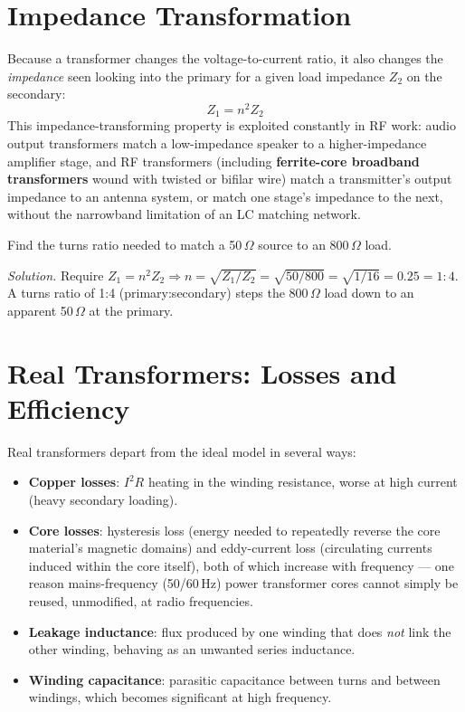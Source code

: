 \section{Impedance Transformation}

Because a transformer changes the voltage-to-current ratio, it also
changes the \emph{impedance} seen looking into the primary for a given
load impedance $Z_2$ on the secondary:
\[
\boxed{Z_1 = n^2 Z_2}
\]
This impedance-transforming property is exploited constantly in RF
work: audio output transformers match a low-impedance speaker to a
higher-impedance amplifier stage, and RF transformers (including
\textbf{ferrite-core broadband transformers} wound with twisted or
bifilar wire) match a transmitter's output impedance to an antenna
system, or match one stage's impedance to the next, without the
narrowband limitation of an LC matching network.

\begin{examplebox}
Find the turns ratio needed to match a 50\,$\Omega$ source to an
800\,$\Omega$ load.

\emph{Solution.} Require $Z_1 = n^2 Z_2 \Rightarrow n = \sqrt{Z_1/Z_2} =
\sqrt{50/800} = \sqrt{1/16} = 0.25 = 1{:}4$. A turns ratio of 1:4
(primary:secondary) steps the 800\,$\Omega$ load down to an apparent
50\,$\Omega$ at the primary.
\end{examplebox}

\section{Real Transformers: Losses and Efficiency}

Real transformers depart from the ideal model in several ways:

\begin{itemize}
\item \textbf{Copper losses}: $I^2R$ heating in the winding resistance,
worse at high current (heavy secondary loading).
\item \textbf{Core losses}: hysteresis loss (energy needed to repeatedly
reverse the core material's magnetic domains) and eddy-current loss
(circulating currents induced within the core itself), both of which
increase with frequency --- one reason mains-frequency (50/60\,Hz) power
transformer cores cannot simply be reused, unmodified, at radio
frequencies.
\item \textbf{Leakage inductance}: flux produced by one winding that
does \emph{not} link the other winding, behaving as an unwanted series
inductance.
\item \textbf{Winding capacitance}: parasitic capacitance between turns
and between windings, which becomes significant at high frequency.
\end{itemize}

